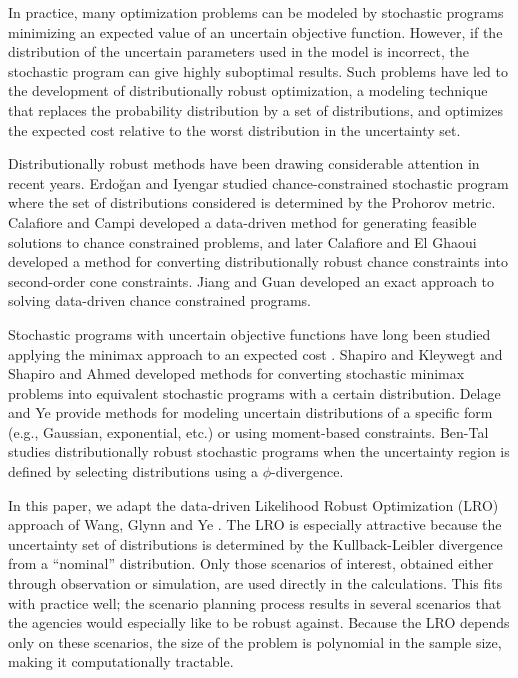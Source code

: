 \documentclass[11pt]{article}
\begin{document}
In practice, many optimization problems can be modeled by stochastic programs minimizing an expected value of an uncertain objective function.
However, if the distribution of the uncertain parameters used in the model is incorrect, the stochastic program can give highly suboptimal results.
Such problems have led to the development of distributionally robust optimization, a modeling technique that replaces the probability distribution by a set of distributions, and optimizes the expected cost relative to the worst distribution in the uncertainty set.

Distributionally robust methods have been drawing considerable attention in recent years.
Erdo{\u{g}}an and Iyengar \cite{erdogan2006ambiguous} studied chance-constrained stochastic program where the set of distributions considered is determined by the Prohorov metric.
Calafiore and Campi \cite{calafiore2005uncertain} developed a data-driven method for generating feasible solutions to chance constrained problems, and later Calafiore and El Ghaoui \cite{calafiore2006distributionally} developed a method for converting distributionally robust chance constraints into second-order cone constraints.
Jiang and Guan \cite{jiang2012data} developed an exact approach to solving data-driven chance constrained programs.

Stochastic programs with uncertain objective functions have long been studied applying the minimax approach to an expected cost \cite{dupacova_87}.
Shapiro and Kleywegt \cite{shapiro2002minimax} and Shapiro and Ahmed \cite{shapiro2004class} developed methods for converting stochastic minimax problems into equivalent stochastic programs with a certain distribution.
Delage and Ye \cite{delage_ye_10} provide methods for modeling uncertain distributions of a specific form (e.g., Gaussian, exponential, etc.) or using moment-based constraints.
Ben-Tal \cite{bental2011robust} studies distributionally robust stochastic programs when the uncertainty region is defined by selecting distributions using a $\phi$-divergence.

In this paper, we adapt the data-driven Likelihood Robust Optimization (LRO) approach of Wang, Glynn and Ye \cite{wang2010likelihood}.
The LRO is especially attractive because the uncertainty set of distributions is determined by the Kullback-Leibler divergence from a ``nominal'' distribution.
Only those scenarios of interest, obtained either through observation or simulation, are used directly in the calculations.
This fits with practice well; the scenario planning process results in several scenarios that the agencies would especially like to be robust against.
Because the LRO depends only on these scenarios, the size of the problem is polynomial in the sample size, making it computationally tractable.
\end{document}
